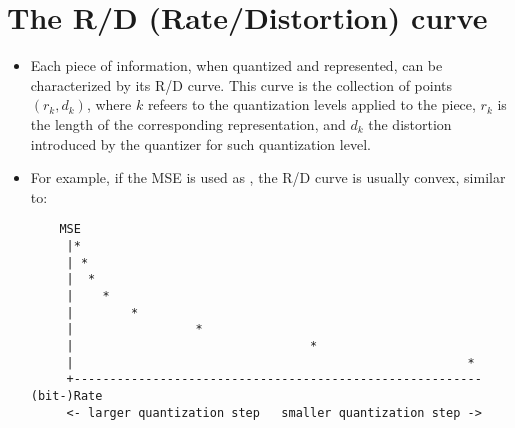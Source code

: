 \section{The R/D (Rate/Distortion) curve}
\begin{itemize}
\item 
  Each piece of information, when quantized and represented, can be
  characterized by its R/D curve. This curve is the collection of
  points $(r_k,d_k)$, where $k$ refeers to the quantization levels
  applied to the piece, $r_k$ is the length of the corresponding
  representation, and $d_k$ the distortion introduced by the quantizer
  for such quantization level.
\item
  For example, if the MSE is used as
  , the R/D curve is
  usually convex, similar to:
\begin{verbatim}
    MSE
     |*
     | *
     |  *
     |    *
     |        *
     |                 *
     |                                 *
     |                                                       *
     +--------------------------------------------------------- (bit-)Rate
     <- larger quantization step   smaller quantization step ->
\end{verbatim}
\end{itemize}

